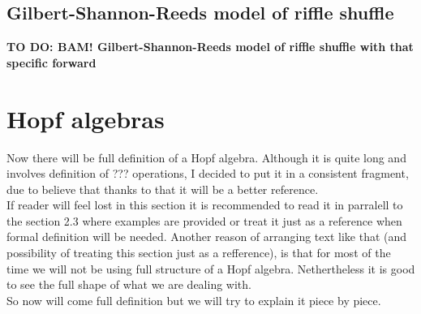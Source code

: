 \documentclass[a4paper, 12pt]{report}
\newcommand{\todo}[1]{\hfill \break \textbf{\Huge TO DO: #1 \hfill \break}\normalsize}
\begin{document}
\section{Gilbert-Shannon-Reeds model of riffle shuffle}
\todo{BAM! Gilbert-Shannon-Reeds model of riffle shuffle with that specific forward}
\chapter{Hopf algebras}
%
Now there will be full definition of a Hopf algebra. Although it is quite long and involves
definition of ??? operations, I decided to put it in a consistent fragment, due to believe
that thanks to that it will be a better reference. \\
If reader will feel lost in this section it is recommended to read it in parralell to the section 2.3
where examples are provided or treat it just as a reference  when formal definition will be needed.
Another reason of arranging text like that (and possibility of treating this section just as a refference),
is that for most of the time we will not be using full structure of a Hopf algebra. Nethertheless it is good
to see the full shape of what we are dealing with. \\
So now will come full definition but we will try to explain it piece by piece. \\[8pt]
\end{document}
